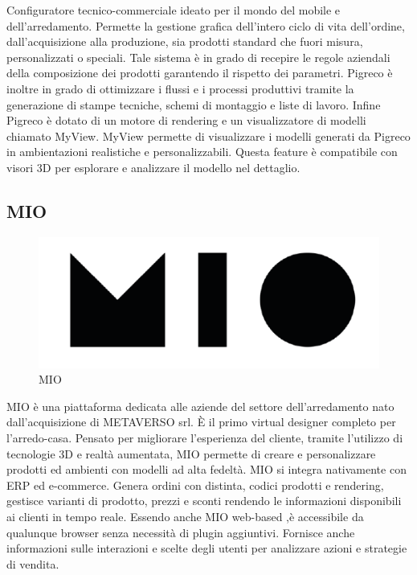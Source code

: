 \documentclass[target=bach,aauheader=,style=]{thud}
\begin{document}

Configuratore tecnico-commerciale ideato per il mondo del mobile e dell'arredamento.
Permette la gestione grafica dell’intero ciclo di vita dell’ordine, dall’acquisizione alla produzione, sia prodotti standard che fuori misura, personalizzati o speciali.
Tale sistema è in grado di recepire le regole aziendali della composizione dei prodotti garantendo il rispetto dei parametri.
Pigreco è inoltre in grado di ottimizzare i flussi e i processi produttivi tramite la generazione di stampe tecniche, schemi di montaggio e liste di lavoro.
Infine Pigreco è dotato di un motore di rendering e un visualizzatore di modelli chiamato MyView.
MyView permette di visualizzare i modelli generati da Pigreco in ambientazioni realistiche e personalizzabili. Questa feature è compatibile con visori 3D per esplorare e analizzare il modello nel dettaglio.

\subsection{MIO}
\begin{figure}
    \begin{center}
        \includegraphics[height=0.06\textheight]{mio.png}
    \end{center}
    \caption{MIO}
\end{figure}



MIO è una piattaforma dedicata alle aziende del settore dell’arredamento nato dall’acquisizione di METAVERSO srl. 
È il primo virtual designer completo per l’arredo-casa.
Pensato per migliorare l’esperienza del cliente, tramite l’utilizzo di tecnologie 3D e realtà aumentata, MIO permette di creare e personalizzare prodotti ed ambienti con modelli ad alta fedeltà.
MIO si integra nativamente con ERP ed e-commerce. Genera ordini con distinta, codici prodotti e rendering, gestisce varianti di prodotto, prezzi e sconti rendendo le informazioni disponibili ai clienti in tempo reale.
Essendo anche MIO web-based ,è accessibile da qualunque browser senza necessità di plugin aggiuntivi. 
Fornisce anche informazioni sulle interazioni e scelte degli utenti per analizzare azioni e strategie di vendita.
\end{document}
